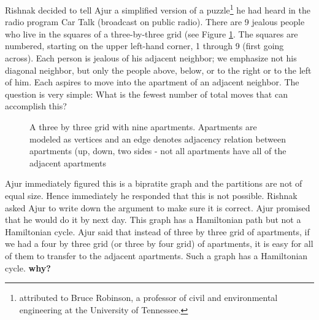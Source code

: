 Rishnak decided to tell Ajur a simplified version of a puzzle\footnote{attributed to Bruce Robinson, a professor of civil and environmental engineering at the University of Tennessee.} he had heard in the radio program Car Talk (broadcast on public radio). There are 9 jealous people who live in the squares of a three-by-three grid (see Figure \ref{5g7}. The squares are numbered, starting on the upper left-hand corner, 1 through 9 (first going across). Each person is jealous of his adjacent neighbor; we emphasize not his diagonal neighbor, but only the people above, below, or to the right or to the left of him. Each aspires to move into the apartment of an adjacent neighbor.
The question is very simple: What is the fewest number of total moves that can accomplish this?
\begin{figure}
\begin{center}
\caption{ A three by three grid with nine apartments. Apartments are modeled as vertices and an edge denotes adjacency relation between apartments (up, down, two sides - not all apartments have all of the adjacent apartments} \label{5g7}
\end{center}
\end{figure}

Ajur immediately figured  this is a bipratite graph and the partitions are not of equal size. Hence immediately he responded that this is not possible. Rishnak asked Ajur to write down the argument to make sure it is correct. Ajur promised that he would do it by next day. This graph has a Hamiltonian path but not a Hamiltonian cycle. Ajur said that instead of three by three grid of apartments, if we had a four by three grid (or three by four grid) of apartments, it is easy for all of them to transfer to the adjacent apartments. Such a graph has a Hamiltonian cycle. \textbf{why?}

